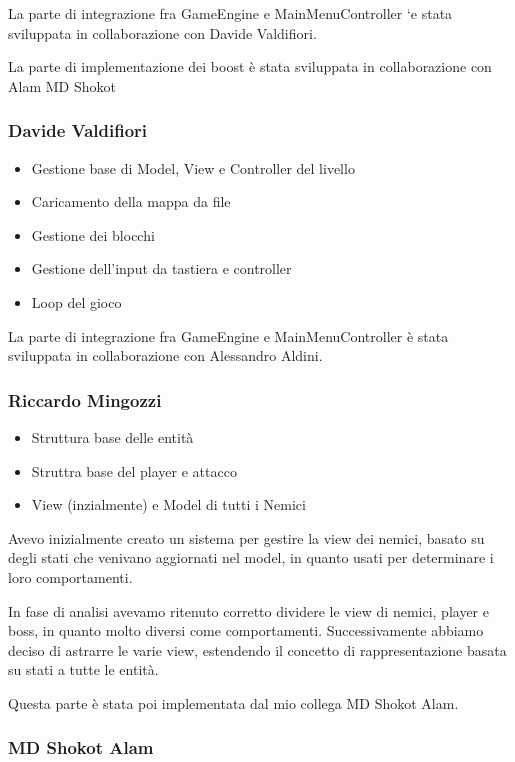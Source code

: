 \documentclass[a4paper,12pt]{report}
\begin{document}
La parte di integrazione fra GameEngine e MainMenuController `e stata 
sviluppata in collaborazione con Davide Valdifiori. 

La parte di implementazione dei boost è stata sviluppata in collaborazione con Alam MD Shokot 
\subsubsection{Davide Valdifiori}

\begin{itemize}
    \item Gestione base di Model, View e Controller del livello
    \item Caricamento della mappa da file
    \item Gestione dei blocchi
    \item Gestione dell'input da tastiera e controller
    \item Loop del gioco
\end{itemize}

La parte di integrazione fra GameEngine e MainMenuController è stata sviluppata in collaborazione con Alessandro Aldini.

\subsubsection{Riccardo Mingozzi}

\begin{itemize}
    \item Struttura base delle entità
    \item Struttra base del player e  attacco
    \item View (inzialmente) e Model di tutti i Nemici
\end{itemize}

Avevo inizialmente creato un sistema per gestire la view dei nemici, basato su degli stati che venivano aggiornati nel model, in quanto usati per determinare i loro
comportamenti. 

In fase di analisi avevamo ritenuto corretto dividere le view di nemici, player e boss, in quanto molto diversi come comportamenti. Successivamente abbiamo deciso di astrarre le varie view, estendendo il concetto di rappresentazione basata su stati a tutte le entità. 

Questa parte è stata poi implementata dal mio collega MD Shokot Alam.

\subsubsection{MD Shokot Alam}
\end{document}
